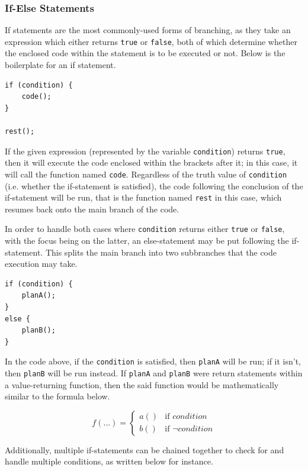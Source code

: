 \documentclass[12pt]{article}
\begin{document}
\subsubsection{If-Else Statements}
If statements are the most commonly-used forms of branching, as they take an expression which either returns \texttt{true} or \texttt{false}, both of which determine whether the enclosed code within the statement is to be executed or not. Below is the boilerplate for an if statement.

\begin{verbatim}
if (condition) {
    code();
}

rest();
\end{verbatim}

If the given expression (represented by the variable \texttt{condition}) returns \texttt{true}, then it will execute the code enclosed within the brackets after it; in this case, it will call the function named \texttt{code}. Regardless of the truth value of \texttt{condition} (i.e. whether the if-statement is satisfied), the code following the conclusion of the if-statement will be run, that is the function named \texttt{rest} in this case, which resumes back onto the main branch of the code.

In order to handle both cases where \texttt{condition} returns either \texttt{true} or \texttt{false}, with the focus being on the latter, an else-statement may be put following the if-statement. This splits the main branch into two subbranches that the code execution may take.

\begin{verbatim}
if (condition) {
    planA();
}
else {
    planB();
}
\end{verbatim}

In the code above, if the \texttt{condition} is satisfied, then \texttt{planA} will be run; if it isn't, then \texttt{planB} will be run instead. If \texttt{planA} and \texttt{planB} were return statements within a value-returning function, then the said function would be mathematically similar to the formula below.

$$f(...) = \begin{cases}
    a() & \text{if } condition \\
    b() & \text{if } \neg condition
\end{cases}$$

Additionally, multiple if-statements can be chained together to check for and handle multiple conditions, as written below for instance.
\end{document}
